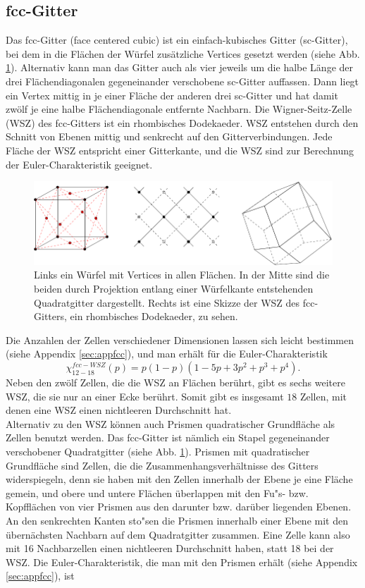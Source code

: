  
\subsection{fcc-Gitter}
\label{sec:schrfcc}
Das fcc-Gitter (face centered cubic) ist ein einfach-kubisches Gitter (sc-Gitter), bei dem in die Fl\"achen der W\"urfel zus\"atzliche Vertices gesetzt werden (siehe Abb. \ref{fig:fcc}). Alternativ kann man das Gitter auch als vier jeweils um die halbe L\"ange der drei Fl\"achendiagonalen gegeneinander verschobene sc-Gitter auffassen. Dann liegt ein Vertex mittig in je einer Fl\"ache der anderen drei sc-Gitter und hat damit zw\"olf je eine halbe Fl\"achendiagonale entfernte Nachbarn. Die Wigner-Seitz-Zelle (WSZ) des fcc-Gitters ist ein rhombisches Dodekaeder. WSZ entstehen durch den Schnitt von Ebenen mittig und senkrecht auf den Gitterverbindungen. Jede Fl\"ache der WSZ entspricht einer Gitterkante, und die WSZ sind zur Berechnung der Euler-Charakteristik geeignet.
\begin{figure}[htbp]
  \centering
  \includegraphics{./Schranken-figs/fcc}
  \caption{Links ein W\"urfel mit Vertices in allen Fl\"achen. In der Mitte sind die beiden durch Projektion entlang einer W\"urfelkante entstehenden Quadratgitter dargestellt. Rechts ist eine Skizze der WSZ des fcc-Gitters, ein rhombisches Dodekaeder, zu sehen.}
  \label{fig:fcc}
\end{figure}
Die Anzahlen der Zellen verschiedener Dimensionen lassen sich leicht bestimmen (siehe Appendix \ref{sec:appfcc}), und man erh\"alt f\"ur die Euler-Charakteristik
\begin{equation}
  \chi^{fcc-WSZ}_{12-18}(p)=p(1-p)(1-5p+3p^2+p^3+p^4).
\end{equation}
Neben den zw\"olf Zellen, die die WSZ an Fl\"achen ber\"uhrt, gibt es sechs weitere WSZ, die sie nur an einer Ecke ber\"uhrt. Somit gibt es insgesamt $18$ Zellen, mit denen eine WSZ einen nichtleeren Durchschnitt hat.\\
Alternativ zu den WSZ k\"onnen auch Prismen quadratischer Grundfl\"ache als Zellen benutzt werden. Das fcc-Gitter ist n\"amlich ein Stapel gegeneinander verschobener Quadratgitter (siehe Abb. \ref{fig:fcc}). Prismen mit quadratischer Grundfl\"ache sind Zellen, die die Zusammenhangsverh\"altnisse des Gitters widerspiegeln, denn sie haben mit den Zellen innerhalb der Ebene je eine Fl\"ache gemein, und obere und untere Fl\"achen \"uberlappen mit den Fu"s- bzw. Kopffl\"achen von vier Prismen aus den darunter bzw. dar\"uber liegenden Ebenen. An den senkrechten Kanten sto"sen die Prismen innerhalb einer Ebene mit den \"ubern\"achsten Nachbarn auf dem Quadratgitter zusammen. Eine Zelle kann also mit 16 Nachbarzellen einen nichtleeren Durchschnitt haben, statt 18 bei der WSZ. Die Euler-Charakteristik, die man mit den Prismen erh\"alt (siehe Appendix \ref{sec:appfcc}), ist
